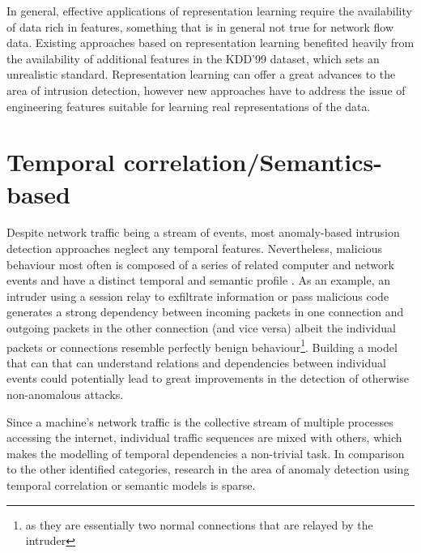 \documentclass[a4paper,12pt,twoside]{report}
\begin{document}
In general, effective applications of representation learning require the availability of data rich in features, something that is in general not true for network flow data. Existing approaches based on representation learning benefited heavily from the availability of additional features in the KDD'99 dataset, which sets an unrealistic standard. Representation learning can offer a great advances to the area of intrusion detection, however new approaches have to address the issue of engineering features suitable for learning real representations of the data.





\section{Temporal correlation/Semantics-based}

Despite network traffic being a stream of events, most anomaly-based intrusion detection approaches neglect any temporal features. Nevertheless, malicious behaviour most often is composed of  a series  of related computer and network  events and have a distinct temporal and semantic profile \cite{ye2000markov}. As an example, an intruder using a session relay to exfiltrate information or pass malicious code generates a strong dependency between incoming packets in one connection and outgoing packets in the other connection (and vice versa) albeit the individual packets or connections resemble perfectly benign behaviour\footnote{as they are essentially two normal connections that are relayed by the intruder}. Building a model that can that can understand relations and dependencies between individual events could potentially lead to great improvements in the detection of otherwise non-anomalous attacks. 

Since a machine's network traffic is the collective stream of multiple processes accessing the internet, individual traffic sequences are mixed with others, which makes the modelling of temporal dependencies a non-trivial task. In comparison to the other identified categories, research in the area of anomaly detection using temporal correlation or semantic models is sparse. 
\end{document}
